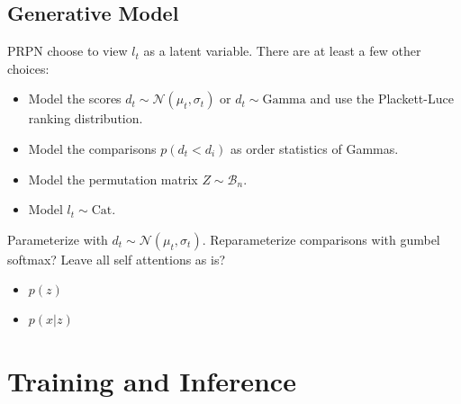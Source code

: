 \documentclass{article}
\begin{document}
\subsection{Generative Model}
PRPN \citep{shen2018prpn} choose to view $l_t$ as a latent variable.
There are at least a few other choices:
\begin{itemize}
\item Model the scores $d_t \sim \mathcal{N}(\mu_t,\sigma_t)$
or $d_t \sim \textrm{Gamma}$
and use the Plackett-Luce ranking distribution.
\item Model the comparisons $p(d_t < d_i)$ as order statistics of Gammas.
\item Model the permutation matrix $Z \sim \mathcal{B}_n$.
\item Model $l_t\sim \textrm{Cat}$.
\end{itemize}
Parameterize with $d_t\sim\mathcal{N}(\mu_t, \sigma_t)$.
Reparameterize comparisons with gumbel softmax?
Leave all self attentions as is?
\begin{itemize}
\item $p(z)$
\item $p(x|z)$
\end{itemize}

\section{Training and Inference}



\end{document}
